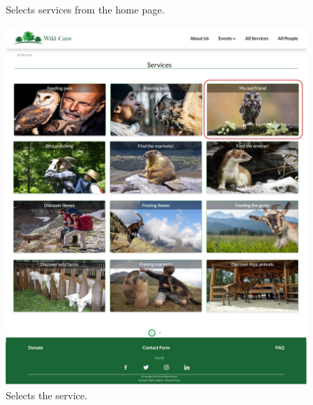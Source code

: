 \begin{figure}[h!]
\begin{minipage}[b]{0.8\textwidth}
			\caption{Selects services from the home page.}
		\end{minipage}
	\end{figure}

	\begin{figure}[h!]
		\centering
		\begin{minipage}[b]{1\textwidth}
    			\includegraphics[width=\textwidth]{./assets/mockups/services_servicedetails.jpg}
			\caption{Selects the service.}
		\end{minipage}
	\end{figure}

